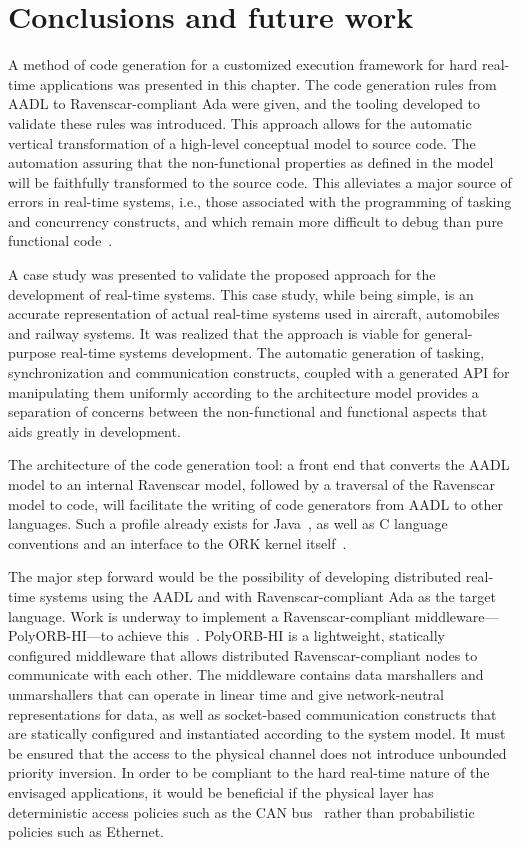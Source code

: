 \section{Conclusions and future work}
A method of code generation for a customized execution framework for
hard real-time applications was presented in this chapter. The code
generation rules from AADL to Ravenscar-compliant Ada were given, and
the tooling developed to validate these rules was introduced. This
approach allows for the automatic vertical transformation of a
high-level conceptual model to source code. The automation assuring
that the non-functional properties as defined in the model will be
faithfully transformed to the source code. This alleviates a major
source of errors in real-time systems, i.e., those associated with the
programming of tasking and concurrency constructs, and which remain
more difficult to debug than pure functional code~\cite{schulz@issta00}.

A case study was presented to validate the proposed approach for the
development of real-time systems. This case study, while being simple,
is an accurate representation of actual real-time systems used in
aircraft, automobiles and railway systems. It was realized that the
approach is viable for general-purpose real-time systems
development. The automatic generation of tasking, synchronization and
communication constructs, coupled with a generated API for
manipulating them uniformly according to the architecture model
provides a separation of concerns between the non-functional
and functional aspects that aids greatly in development.

The architecture of the code generation tool: a front end that
converts the AADL model to an internal Ravenscar model, followed by a
traversal of the Ravenscar model to code, will facilitate the writing
of code generators from AADL to other languages. Such a profile
already exists for Java~\cite{kwon@jgi02}, as well as C language
conventions and an interface to the ORK kernel
itself~\cite{upm-ork-manual}.

The major step forward would be the possibility of developing
distributed real-time systems using the AADL and with
Ravenscar-compliant Ada as the target language. Work is underway to
implement a Ravenscar-compliant middleware---PolyORB-HI---to achieve
this~\cite{zalila@ae07}. PolyORB-HI is a lightweight, statically
configured middleware that allows distributed Ravenscar-compliant
nodes to communicate with each other. The middleware contains data
marshallers and unmarshallers that can operate in linear time and give
network-neutral representations for data, as well as socket-based
communication constructs that are statically configured and
instantiated according to the system model. It must be ensured that
the access to the physical channel does not introduce unbounded
priority inversion. In order to be compliant to the hard real-time
nature of the envisaged applications, it would be beneficial if the
physical layer has deterministic access policies such as the CAN
bus~\cite{davis@rts07} rather than probabilistic policies such as
Ethernet.


